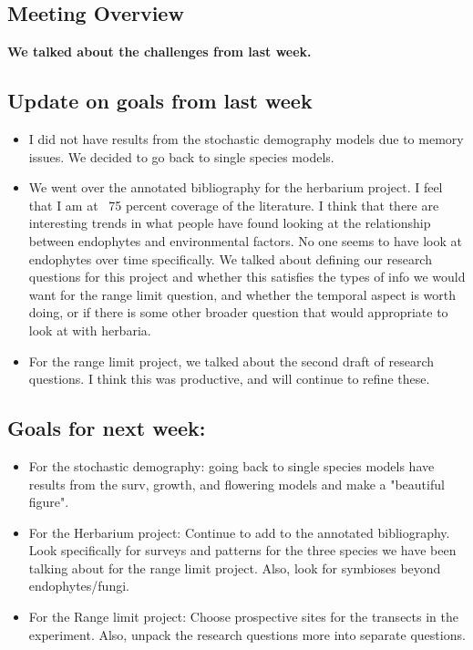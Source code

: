 \documentclass{article}
\begin{document}
\subsection*{Meeting Overview}
\textbf{We talked about the challenges from last week.}

\subsection*{Update on goals from last week}
\begin{itemize}
\item{I did not have results from the stochastic demography models due to memory issues. We decided to go back to single species models.}
\item{We went over the annotated bibliography for the herbarium project. I feel that I am at ~75 percent coverage of the literature. I think that there are interesting trends in what people have found looking at the relationship between endophytes and environmental factors. No one seems to have look at endophytes over time specifically. We talked about defining our research questions for this project and whether this satisfies the types of info we would want for the range limit question, and whether the temporal aspect is worth doing, or if there is some other broader question that would appropriate to look at with herbaria.}
\item{For the range limit project, we talked about the second draft of research questions. I think this was productive, and will continue to refine these.}
\end{itemize}

\subsection*{Goals for next week:}
\begin{itemize}
\item{For the stochastic demography: going back to single species models have results from the surv, growth, and flowering models and make a "beautiful figure".}
\item{For the Herbarium project: Continue to add to the annotated bibliography. Look specifically for surveys and patterns for the three species we have been talking about for the range limit project. Also, look for symbioses beyond endophytes/fungi.}
\item{For the Range limit project: Choose prospective sites for the transects in the experiment. Also, unpack the research questions more into separate questions.}
\end{itemize}
\end{document}
